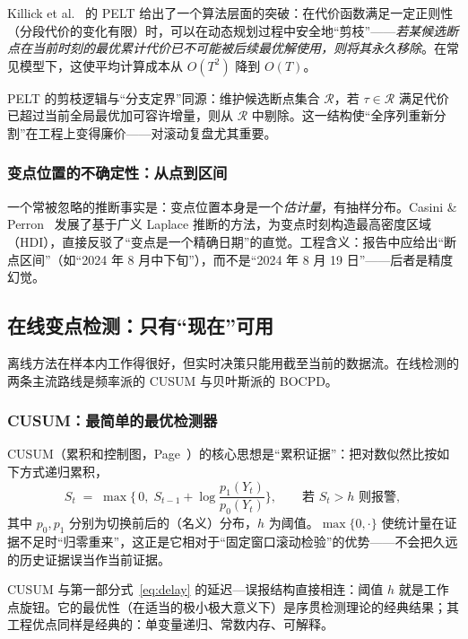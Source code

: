 Killick et al.~\cite{killick2012} 的 PELT 给出了一个算法层面的突破：在代价函数满足一定正则性（分段代价的变化有限）时，可以在动态规划过程中安全地“剪枝”——\emph{若某候选断点在当前时刻的最优累计代价已不可能被后续最优解使用，则将其永久移除}。在常见模型下，这使平均计算成本从 $O(T^2)$ 降到 $O(T)$。

\begin{remark}[剪枝直觉]
PELT 的剪枝逻辑与“分支定界”同源：维护候选断点集合 $\mathcal{R}$，若 $\tau \in \mathcal{R}$ 满足代价已超过当前全局最优加可容许增量，则从 $\mathcal{R}$ 中剔除。这一结构使“全序列重新分割”在工程上变得廉价——对滚动复盘尤其重要。
\end{remark}

\subsubsection{变点位置的不确定性：从点到区间}

一个常被忽略的推断事实是：变点位置本身是一个\emph{估计量}，有抽样分布。Casini \& Perron~\cite{casini2022} 发展了基于广义 Laplace 推断的方法，为变点时刻构造最高密度区域（HDI），直接反驳了“变点是一个精确日期”的直觉。工程含义：报告中应给出“断点区间”（如“2024 年 8 月中下旬”），而不是“2024 年 8 月 19 日”——后者是精度幻觉。

\subsection{在线变点检测：只有“现在”可用}

离线方法在样本内工作得很好，但实时决策只能用截至当前的数据流。在线检测的两条主流路线是频率派的 CUSUM 与贝叶斯派的 BOCPD。

\subsubsection{CUSUM：最简单的最优检测器}

CUSUM（累积和控制图，Page~\cite{page1954}）的核心思想是“累积证据”：把对数似然比按如下方式递归累积，
\begin{equation}
S_t \;=\; \max\Big\{\,0,\; S_{t-1} + \log \frac{p_1(Y_t)}{p_0(Y_t)} \Big\},
\qquad
\text{若 } S_t > h \text{ 则报警},
\end{equation}
其中 $p_0, p_1$ 分别为切换前后的（名义）分布，$h$ 为阈值。$\max\{0, \cdot\}$ 使统计量在证据不足时“归零重来”，这正是它相对于“固定窗口滚动检验”的优势——不会把久远的历史证据误当作当前证据。

CUSUM 与第一部分式~\eqref{eq:delay} 的延迟—误报结构直接相连：阈值 $h$ 就是工作点旋钮。它的最优性（在适当的极小极大意义下）是序贯检测理论的经典结果；其工程优点同样是经典的：单变量递归、常数内存、可解释。

